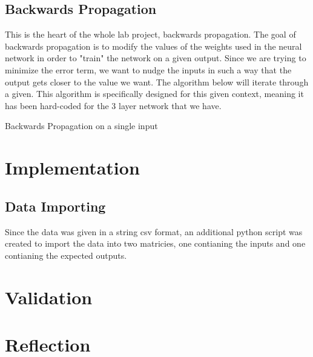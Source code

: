 \documentclass[10pt]{article}
\begin{document}
\subsection{Backwards Propagation}
This is the heart of the whole lab project, backwards propagation. The goal of backwards propagation is to modify the values of the weights used in the neural network in order to "train" the network on a given output. Since we are trying to minimize the error term, we want to nudge the inputs in such a way that the output gets closer to the value we want. The algorithm below will iterate through a given. This algorithm is specifically designed for this given context, meaning it has been hard-coded for the 3 layer network that we have.\\
\begin{algorithm}[H]
    \caption{Backwards Propagation on a single input}

\end{algorithm}


\section{Implementation}
\subsection{Data Importing}
Since the data was given in a string csv format, an additional python script was created to import the data into two matricies, one contianing the inputs and one contianing the expected outputs.
\section{Validation}
\section{Reflection}
\end{document}
